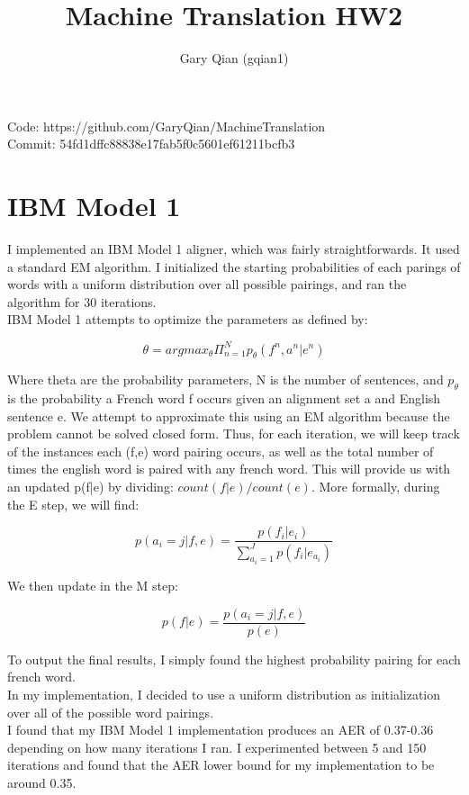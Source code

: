 \documentclass{article}
\begin{document}
\title{Machine Translation HW2}
\author{Gary Qian (gqian1)}
\maketitle
$\ $\\
Code: https://github.com/GaryQian/MachineTranslation\\
Commit: 54fd1dffc88838e17fab5f0c5601ef61211bcfb3

\section{IBM Model 1}

I implemented an IBM Model 1 aligner, which was fairly straightforwards. It used a standard EM algorithm. I initialized the starting probabilities of each parings of words with a uniform distribution over all possible pairings, and ran the algorithm for 30 iterations.\\

IBM Model 1 attempts to optimize the parameters as defined by:

\[
\theta = argmax_\theta \Pi^N_{n=1}p_\theta (f^n, a^n | e^n)
\]

Where theta are the probability parameters, N is the number of sentences, and $p_\theta$ is the probability a French word f occurs given an alignment set a and English sentence e. We attempt to approximate this using an EM algorithm because the problem cannot be solved closed form. Thus, for each iteration, we will keep track of the instances each (f,e) word pairing occurs, as well as the total number of times the english word is paired with any french word. This will provide us with an updated p(f|e) by dividing: $count(f|e) / count(e)$. More formally, during the E step, we will find:

\[
p(a_i = j|f,e) = \frac{p(f_i|e_i)}{\sum^J_{a_i=1}p(f_i|e_{a_i})}
\]

We then update in the M step:

\[
p(f|e) = \frac{p(a_i = j|f,e)}{p(e)}
\]

To output the final results, I simply found the highest probability pairing for each french word.\\ 

In my implementation, I decided to use a uniform distribution as initialization over all of the possible word pairings.\\

I found that my IBM Model 1 implementation produces an AER of 0.37-0.36 depending on how many iterations I ran. I experimented between 5 and 150 iterations and found that the AER lower bound for my implementation to be around 0.35.
\end{document}
